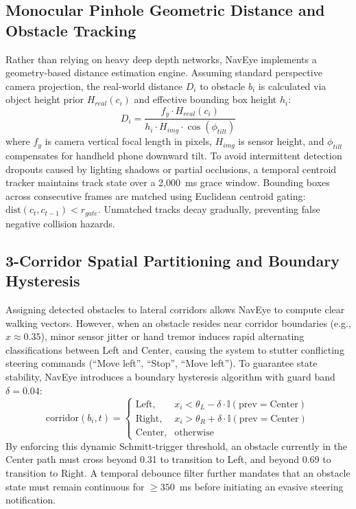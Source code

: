 \documentclass[conference]{IEEEtran}
\begin{document}
\subsection{Monocular Pinhole Geometric Distance and Obstacle Tracking}
Rather than relying on heavy deep depth networks, NavEye implements a geometry-based distance estimation engine. Assuming standard perspective camera projection, the real-world distance $D_i$ to obstacle $b_i$ is calculated via object height prior $H_{real}(c_i)$ and effective bounding box height $h_i$:
\begin{equation}
D_i = \frac{f_y \cdot H_{real}(c_i)}{h_i \cdot H_{img} \cdot \cos(\phi_{tilt})}
\end{equation}
where $f_y$ is camera vertical focal length in pixels, $H_{img}$ is sensor height, and $\phi_{tilt}$ compensates for handheld phone downward tilt. To avoid intermittent detection dropouts caused by lighting shadows or partial occlusions, a temporal centroid tracker maintains track state over a 2,000~ms grace window. Bounding boxes across consecutive frames are matched using Euclidean centroid gating: $\text{dist}(c_t, c_{t-1}) < r_{gate}$. Unmatched tracks decay gradually, preventing false negative collision hazards.

\subsection{3-Corridor Spatial Partitioning and Boundary Hysteresis}
Assigning detected obstacles to lateral corridors allows NavEye to compute clear walking vectors. However, when an obstacle resides near corridor boundaries (e.g., $x \approx 0.35$), minor sensor jitter or hand tremor induces rapid alternating classifications between Left and Center, causing the system to stutter conflicting steering commands (``Move left'', ``Stop'', ``Move left''). To guarantee state stability, NavEye introduces a boundary hysteresis algorithm with guard band $\delta = 0.04$:
\begin{equation}
\text{corridor}(b_i, t) = \begin{cases}
\text{Left}, & x_i < \theta_L - \delta \cdot \mathbb{I}(\text{prev} = \text{Center}) \\
\text{Right}, & x_i > \theta_R + \delta \cdot \mathbb{I}(\text{prev} = \text{Center}) \\
\text{Center}, & \text{otherwise}
\end{cases}
\end{equation}
By enforcing this dynamic Schmitt-trigger threshold, an obstacle currently in the Center path must cross beyond 0.31 to transition to Left, and beyond 0.69 to transition to Right. A temporal debounce filter further mandates that an obstacle state must remain continuous for $\ge 350$~ms before initiating an evasive steering notification.
\end{document}
